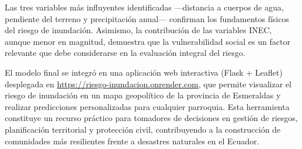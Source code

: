 \documentclass[12pt,a4paper]{article}
\begin{document}
Las tres variables más influyentes identificadas ---distancia a cuerpos de agua, pendiente del terreno y precipitación anual--- confirman los fundamentos físicos del riesgo de inundación. Asimismo, la contribución de las variables INEC, aunque menor en magnitud, demuestra que la vulnerabilidad social es un factor relevante que debe considerarse en la evaluación integral del riesgo.

El modelo final se integró en una aplicación web interactiva (Flask + Leaflet) desplegada en \url{https://riesgo-inundacion.onrender.com}, que permite visualizar el riesgo de inundación en un mapa geopolítico de la provincia de Esmeraldas y realizar predicciones personalizadas para cualquier parroquia. Esta herramienta constituye un recurso práctico para tomadores de decisiones en gestión de riesgos, planificación territorial y protección civil, contribuyendo a la construcción de comunidades más resilientes frente a desastres naturales en el Ecuador.
\end{document}
